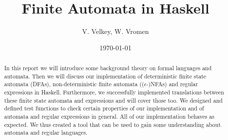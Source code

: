 \documentclass[12pt,a4paper]{article}
\title{Finite Automata in Haskell}
\author{V. Velkey, W. Vromen}
\date{\today}
\begin{document}
\maketitle

\begin{abstract}
\noindent In this report we will introduce some background theory on formal languages and automata. Then we will discuss our implementation of deterministic finite state automata (DFAs), non-deterministic finite automata (($\epsilon$-)NFAs) and regular expressions in Haskell. Furthermore, we successfully implemented translations between these finite state automata and expressions and will cover those too. We designed and defined test functions to check certain properties of our implementation and of automata and regular expressions in general. All of our implementation behaves as expected. We thus created a tool that can be used to gain some understanding about automata and regular languages.
\end{abstract}

\vfill

\tableofcontents

\clearpage










%






\end{document}
